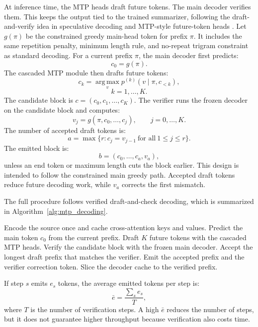 \documentclass[11pt]{article}
\begin{document}
At inference time, the MTP heads draft future tokens.
The main decoder verifies them.
This keeps the output tied to the trained summarizer, following the draft-and-verify idea in speculative decoding \citep{leviathan2023speculative} and MTP-style future-token heads \citep{gloeckle2024mtp,zhao2026mtpdistill}.
Let $g(\pi)$ be the constrained greedy main-head token for prefix $\pi$.
It includes the same repetition penalty, minimum length rule, and no-repeat trigram constraint as standard decoding.
For a current prefix $\pi$, the main decoder first predicts:
\begin{equation}
c_0=g(\pi).
\end{equation}
The cascaded MTP module then drafts future tokens:
\begin{equation}
c_k=\operatorname*{arg\,max}_{v}
p^{(k)}(v\mid \pi,c_{<k}),
\end{equation}
\begin{equation}
k=1,\ldots,K.
\end{equation}
The candidate block is $c=(c_0,c_1,\ldots,c_K)$.
The verifier runs the frozen decoder on the candidate block and computes:
\begin{equation}
v_j=g(\pi,c_0,\ldots,c_j),
\qquad j=0,\ldots,K.
\end{equation}
The number of accepted draft tokens is:
\begin{equation}
a=\max\{r: c_j=v_{j-1}\ \text{for all}\ 1\leq j\leq r\}.
\end{equation}
The emitted block is:
\begin{equation}
b=(c_0,\ldots,c_a,v_a),
\end{equation}
unless an end token or maximum length cuts the block earlier.
This design is intended to follow the constrained main greedy path.
Accepted draft tokens reduce future decoding work, while $v_a$ corrects the first mismatch.

The full procedure follows verified draft-and-check decoding, which is summarized in Algorithm~\ref{alg:mtp_decoding}.

\begin{algorithm}[H]
\caption{Verified MTP Draft-and-Check Decoding}
\label{alg:mtp_decoding}
\begin{algorithmic}[1]
\State Encode the source once and cache cross-attention keys and values.
\Repeat
    \State Predict the main token $c_0$ from the current prefix.
    \State Draft $K$ future tokens with the cascaded MTP heads.
    \State Verify the candidate block with the frozen main decoder.
    \State Accept the longest draft prefix that matches the verifier.
    \State Emit the accepted prefix and the verifier correction token.
    \State Slice the decoder cache to the verified prefix.
\end{algorithmic}
\end{algorithm}
If step $s$ emits $e_s$ tokens, the average emitted tokens per step is:
\begin{equation}
\bar{e}=\frac{\sum_s e_s}{T},
\end{equation}
where $T$ is the number of verification steps.
A high $\bar{e}$ reduces the number of steps, but it does not guarantee higher throughput because verification also costs time.
\end{document}
